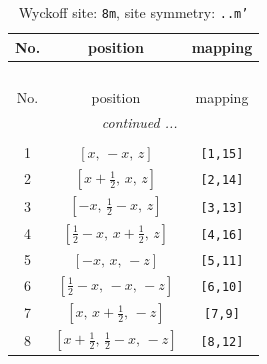 \documentclass[fleqn,8pt]{jsarticle}
\begin{document}
\begin{longtable}{ccc}
\caption{Wyckoff site: {\tt 8m}, site symmetry: {\tt ..m'}}
 \\
 \hline \hline
No. & position & mapping \\ \hline \endfirsthead

\multicolumn{2}{l}{\tablename\ \thetable{}} \\
 \hline \hline
No. & position & mapping \\ \hline \endhead

 \hline \hline
\multicolumn{2}{r}{\footnotesize\it continued ...} \\ \endfoot

 \hline \hline
\multicolumn{2}{r}{} \\ \endlastfoot

1 & $\left[ x,\, - x,\, z \right]$ & {\tt [1,15]} \\ \hline
2 & $\left[ x + \frac{1}{2},\, x,\, z \right]$ & {\tt [2,14]} \\ \hline
3 & $\left[ - x,\, \frac{1}{2} - x,\, z \right]$ & {\tt [3,13]} \\ \hline
4 & $\left[ \frac{1}{2} - x,\, x + \frac{1}{2},\, z \right]$ & {\tt [4,16]} \\ \hline
5 & $\left[ - x,\, x,\, - z \right]$ & {\tt [5,11]} \\ \hline
6 & $\left[ \frac{1}{2} - x,\, - x,\, - z \right]$ & {\tt [6,10]} \\ \hline
7 & $\left[ x,\, x + \frac{1}{2},\, - z \right]$ & {\tt [7,9]} \\ \hline
8 & $\left[ x + \frac{1}{2},\, \frac{1}{2} - x,\, - z \right]$ & {\tt [8,12]} \\
\end{longtable}
\renewcommand{\arraystretch}{1.2}
\end{document}
